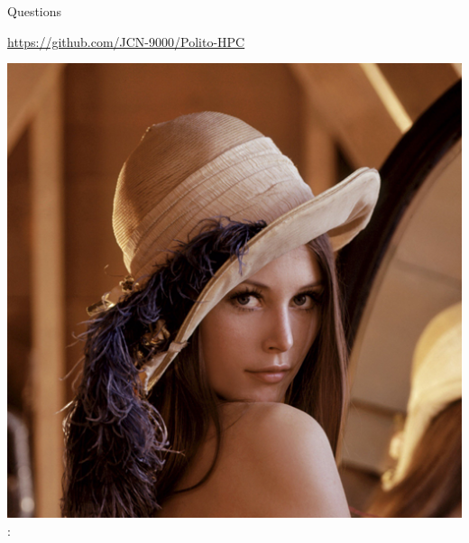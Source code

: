 \documentclass[ignorenonframetext,]{beamer}
\providecommand{\tightlist}{%
  \setlength{\itemsep}{0pt}\setlength{\parskip}{0pt}}
\begin{document}
\begin{frame}{Questions}

\begin{description}
\tightlist
\item[Slides on GIT]
\url{https://github.com/JCN-9000/Polito-HPC}
\end{description}

\includegraphics{images/Lenna-Q1.png} :

\end{frame}
\end{document}
